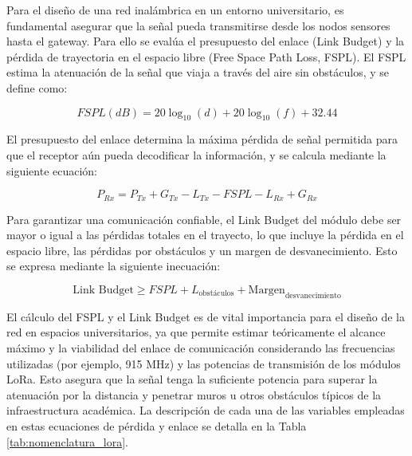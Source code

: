 Para el diseño de una red inalámbrica en un entorno universitario, es fundamental asegurar que la señal pueda transmitirse desde los nodos sensores hasta el gateway. Para ello se evalúa el presupuesto del enlace (Link Budget) y la pérdida de trayectoria en el espacio libre (Free Space Path Loss, FSPL). El FSPL estima la atenuación de la señal que viaja a través del aire sin obstáculos, y se define como:

\begin{equation}\label{eq:fspl}
	FSPL (dB) = 20 \log_{10}(d) + 20 \log_{10}(f) + 32.44
\end{equation}

El presupuesto del enlace determina la máxima pérdida de señal permitida para que el receptor aún pueda decodificar la información, y se calcula mediante la siguiente ecuación:

\begin{equation}\label{eq:link_budget}
	P_{Rx} = P_{Tx} + G_{Tx} - L_{Tx} - FSPL - L_{Rx} + G_{Rx}
\end{equation}

Para garantizar una comunicación confiable, el Link Budget del módulo debe ser mayor o igual a las pérdidas totales en el trayecto, lo que incluye la pérdida en el espacio libre, las pérdidas por obstáculos y un margen de desvanecimiento. Esto se expresa mediante la siguiente inecuación:

\begin{equation}\label{eq:link_budget_inecuacion}
	\text{Link Budget} \geq FSPL + L_{\text{obstáculos}} + \text{Margen}_{\text{desvanecimiento}}
\end{equation}

El cálculo del FSPL y el Link Budget es de vital importancia para el diseño de la red en espacios universitarios, ya que permite estimar teóricamente el alcance máximo y la viabilidad del enlace de comunicación considerando las frecuencias utilizadas (por ejemplo, 915 MHz) y las potencias de transmisión de los módulos LoRa. Esto asegura que la señal tenga la suficiente potencia para superar la atenuación por la distancia y penetrar muros u otros obstáculos típicos de la infraestructura académica. La descripción de cada una de las variables empleadas en estas ecuaciones de pérdida y enlace se detalla en la Tabla \ref{tab:nomenclatura_lora}.

